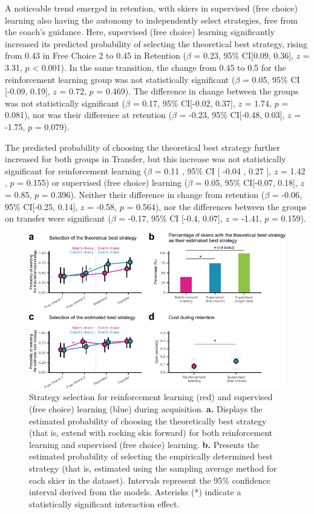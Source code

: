\documentclass[pdflatex,sn-mathphys-num]{sn-jnl}%
\theoremstyle{thmstyleone}%
\theoremstyle{thmstyletwo}%
\theoremstyle{thmstylethree}%
\begin{document}
A noticeable trend emerged in retention, with skiers in supervised (free choice) learning also having the autonomy to independently select strategies, free from the coach's guidance. Here, supervised (free choice) learning significantly increased its predicted probability of selecting the theoretical best strategy, rising from 0.43 in Free Choice 2 to 0.45 in Retention ($\beta$ = 0.23, 95\% CI[0.09, 0.36], $z$ = 3.31, $p$ < 0.001). In the same transition, the change from 0.45 to 0.5 for the reinforcement learning group was not statistically significant ($\beta$ = 0.05, 95\% CI [-0.09, 0.19], $z$ = 0.72, $p$ = 0.469). The difference in change between the groups was not statistically significant ($\beta$ = 0.17, 95\% CI[-0.02,  0.37], $z$ = 1.74, $p$ = 0.081), nor was their difference at retention ($\beta$ = -0.23, 95\% CI[-0.48, 0.03], $z$ = -1.75, $p$ = 0.079).

The predicted probability of choosing the theoretical best strategy further increased for both groups in Transfer, but this increase was not statistically significant for reinforcement learning ($\beta$ = 0.11 , 95\% CI [ -0.04 ,  0.27 ], $z$ = 1.42 , $p$  =  0.155) or supervised (free choice) learning ($\beta$ = 0.05, 95\% CI[-0.07, 0.18], $z$ = 0.85, $p$ = 0.396). Neither their difference in change from retention ($\beta$ = -0.06, 95\% CI[-0.25, 0.14], $z$ = -0.58, $p$  =  0.564), nor the differences between the groups on transfer were significant ($\beta$ = -0.17, 95\% CI [-0.4, 0.07], $z$ = -1.41, $p$ = 0.159).


\begin{figure}[H]
\centering
\includegraphics{figures/figure_choice_estimated_4.pdf}
\caption{Strategy selection for reinforcement learning (red) and supervised (free choice) learning (blue) during acquisition. \textbf{a.} Displays the estimated probability of choosing the theoretically best strategy (that is, extend with rocking skis forward) for both reinforcement learning and supervised (free choice) learning. \textbf{b.} Presents the estimated probability of selecting the empirically determined best strategy (that is, estimated using the sampling average method for each skier in the dataset). Intervals represent the 95\% confidence interval derived from the models. Asterisks (*) indicate a statistically significant interaction effect.}\label{fig: choice_estimated}
\end{figure}
\end{document}
